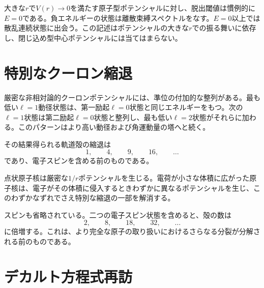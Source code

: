 大きな\(r\)で\(V(r)\to0\)を満たす原子型ポテンシャルに対し、脱出閾値は慣例的に\(E=0\)である。負エネルギーの状態は離散束縛スペクトルをなす。\(E=0\)以上では散乱連続状態に出会う。この記述はポテンシャルの大きな\(r\)での振る舞いに依存し、閉じ込め型中心ポテンシャルには当てはまらない。

\section{特別なクーロン縮退}

厳密な非相対論的クーロンポテンシャルには、準位の付加的な整列がある。最も低い\(\ell=1\)動径状態は、第一励起\(\ell=0\)状態と同じエネルギーをもつ。次の\(\ell=1\)状態は第二励起\(\ell=0\)状態と整列し、最も低い\(\ell=2\)状態がそれらに加わる。このパターンはより高い動径および角運動量の塔へと続く。

\begin{classroomqa}
\end{classroomqa}

その結果得られる軌道殻の縮退は
\begin{equation}
1,\qquad 4,\qquad 9,\qquad 16,\qquad \ldots
\end{equation}
であり、電子スピンを含める前のものである。

\begin{classroomqa}
\end{classroomqa}

点状原子核は厳密な\(1/r\)ポテンシャルを生じる。電荷が小さな体積に広がった原子核は、電子がその体積に侵入するときわずかに異なるポテンシャルを生じ、このわずかなずれでさえ特別な縮退の一部を解消する。

スピンも省略されている。二つの電子スピン状態を含めると、殻の数は
\begin{equation}
2,\qquad 8,\qquad 18,\qquad 32,\qquad \ldots
\end{equation}
に倍増する。これは、より完全な原子の取り扱いにおけるさらなる分裂が分解される前のものである。

\section{デカルト方程式再訪}

